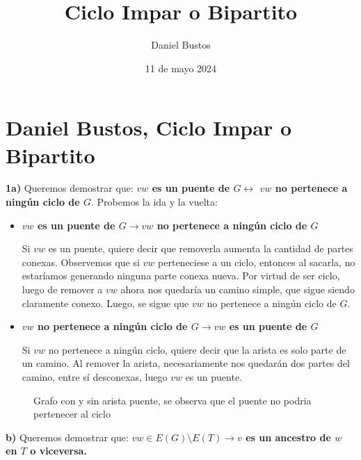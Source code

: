 \documentclass{article}
\title{Ciclo Impar o Bipartito}
\author{Daniel Bustos}
\date{11 de mayo 2024}
\begin{document}
\section*{Daniel Bustos, Ciclo Impar o Bipartito}

\textbf{1a)} Queremos demostrar que: \textbf{$vw$ es un puente de $G \leftrightarrow$ $vw$ no pertenece a ningún ciclo de $G$}. Probemos la ida y la vuelta:
\begin{itemize}


\item \textbf{ $vw$ es un puente de $G \rightarrow vw$ no pertenece a ningún ciclo de $G$}

Si $vw$ es un puente, quiere decir que removerla aumenta la cantidad de partes conexas. Observemos que si $vw$ perteneciese a un ciclo, entonces al sacarla, no estaríamos generando ninguna parte conexa nueva. Por virtud de ser ciclo, luego de remover a $vw$ ahora nos quedaría un camino simple, que sigue siendo claramente conexo. Luego, se sigue que $vw$ no pertenece a ningún ciclo de $G$.

\item \textbf{$vw$ no pertenece a ningún ciclo de $G \rightarrow vw$ es un puente de $G$}

Si $vw$ no pertenece a ningún ciclo, quiere decir que la arista es solo parte de un camino. Al remover la arista, necesariamente nos quedarán dos partes del camino, entre sí desconexas, luego $vw$ es un puente.
\end{itemize}
\begin{figure}[h]
    \centering
    \hspace{1cm}
    \caption{Grafo con y sin arista puente, se observa que el puente no podria pertenecer al ciclo}
\end{figure}
\textbf{b)} Queremos demostrar que: \textbf{$vw \in E(G) \setminus E(T) \rightarrow v$ es un ancestro de $w$ en $T$ o viceversa.}
\end{document}
